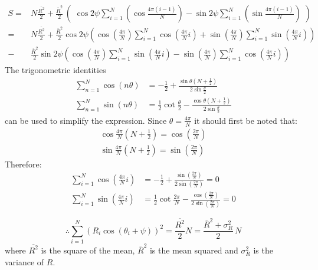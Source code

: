 		\begin{equation*}
			\begin{split}
			S =& N\frac{\overline{R^2}}{2} + \frac{\overline{R}^2}{2}\,\left(\,\,\cos 2\psi\sum_{i=1}^{N}\left(\cos\frac{4\pi\left(i-1\right)}{N}\right) - \sin 		2\psi\sum_{i=1}^{N}\left(\sin\frac{4\pi\left(i-1\right)}{N}\right)\,\,\right) \\
			=& N\frac{\overline{R^2}}{2} + \frac{\overline{R}^2}{2}\cos 2\psi\left(\cos\left(\frac{4\pi}{N}\right)\sum_{i=1}^{N}\cos\left(\frac{4\pi}{N}i\right) + 		\sin\left(\frac{4\pi}{N}\right)\sum_{i=1}^{N}\sin\left(\frac{4\pi}{N}i\right)\right)  \\ 
			-& \frac{\overline{R}^2}{2}\sin 2\psi\left(\cos\left(\frac{4\pi}{N}\right)\sum_{i=1}^{N}\sin\left(\frac{4\pi}{N}i\right) - \sin\left(\frac{4\pi}{N}\right)\sum_{i=1}^{N}\cos\left(\frac{4\pi}{N}i\right)\right)
			\end{split}
		\end{equation*}
		The trigonometric identities
		\begin{align*}
			\sum_{n=1}^{N}\cos(n\theta) &= -\frac{1}{2} + \frac{\sin \theta(N+\frac{1}{2})}{2\sin  \frac{\theta}{2}}\\
			\sum_{n=1}^{N}\sin(n\theta) &= \frac{1}{2}\cot\frac{\theta}{2} - \frac{\cos \theta(N+\frac{1}{2})}{2\sin \frac{\theta}{2}}
		\end{align*} can be used to simplify the expression. Since $\theta=\frac{4\pi}{N}$ it should first be noted that:
		\begin{align*}
			\cos \frac{4\pi}{N}(N+\frac{1}{2}) = \cos(\frac{2\pi}{N}) \\
			\sin \frac{4\pi}{N}(N+\frac{1}{2}) = \sin(\frac{2\pi}{N})
		\end{align*} 
		Therefore:
		\begin{align*}
			\sum_{i=1}^{N}\cos\left(\frac{4\pi}{N}i\right) &=-\frac{1}{2} + \frac{\sin(\frac{2\pi}{N})}{2\sin(\frac{2\pi}{N}) } = 0\\
			\sum_{i=1}^{N}\sin\left(\frac{4\pi}{N}i\right) &= \frac{1}{2}\cot\frac{2\pi}{N} - \frac{\cos(\frac{2\pi}{N})}{2\sin(\frac{2\pi}{N})} = 0
		\end{align*}
	
		\begin{equation*}
			\therefore \sum_{i=1}^{N}\left(R_i\cos\left(\theta_i+\psi\right)\right)^2 = \frac{\overline{R^2}}{2}N = \frac{\overline{R}^2+\sigma_R^2}{2}\,N
		\end{equation*} where $\overline{R^2}$ is the square of the mean, $\overline{R}^2$ is the mean squared and $\sigma_R^2$ is the variance of $R$.

